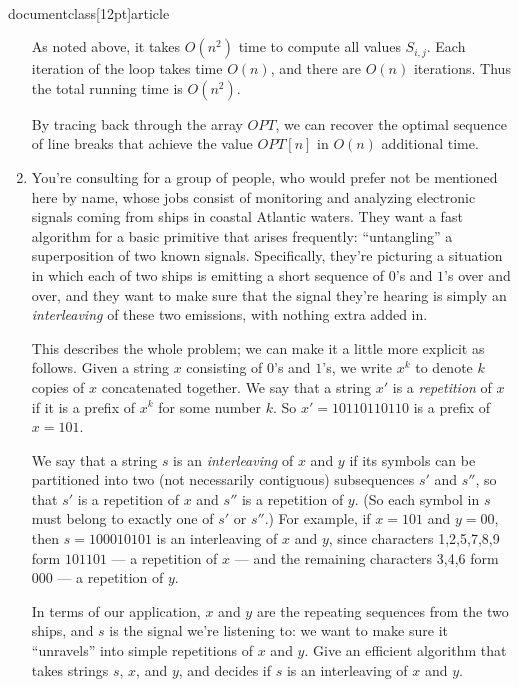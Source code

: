 \\documentclass[12pt]{article}
\begin{document}
\begin{enumerate}
{As noted above, it takes $O(n^2)$ time to compute all values $S_{i,j}$.
Each iteration of the loop takes time $O(n)$, and there are
$O(n)$ iterations.
Thus the total running time is $O(n^2)$.

By tracing back through the array $OPT$, we can recover
the optimal sequence of line breaks that achieve the
value $OPT[n]$ in $O(n)$ additional time.

}


\item

You're consulting for a group of people,
who would prefer not be mentioned here by name,
whose jobs consist of
monitoring and analyzing electronic signals coming from ships in
coastal Atlantic waters.
They want a fast algorithm for a basic primitive that arises frequently:
``untangling'' a superposition of two known signals.
Specifically, they're picturing a situation
in which each of two ships is emitting a short sequence
of $0$'s and $1$'s over and over, and they want to make sure
that the signal they're hearing is simply an {\em interleaving}
of these two emissions, with nothing extra added in.

This describes the whole problem;
we can make it a little more explicit as follows.
Given a string $x$ consisting of $0$'s and $1$'s,
we write $x^k$ to denote $k$ copies of $x$ concatenated together.
We say that a string $x'$ is a {\em repetition} of $x$
if it is a prefix of $x^k$ for some number $k$.
So $x' = 10110110110$ is a prefix of $x = 101$.

We say that a string $s$ is an {\em interleaving} of $x$ and $y$
if its symbols can be partitioned into two
(not necessarily contiguous) subsequences $s'$ and $s''$,
so that $s'$ is a repetition of $x$ and $s''$ is a repetition of $y$.
(So each symbol in $s$ must belong to exactly one of $s'$ or $s''$.)
For example, if $x = 101$ and $y = 00$, then $s = 100010101$ is
an interleaving of $x$ and $y$, since characters 1,2,5,7,8,9
form $101101$ --- a repetition of $x$ ---
and the remaining characters 3,4,6 form $000$ --- a repetition of $y$.

In terms of our application, $x$ and $y$ are the repeating sequences
from the two ships, and $s$ is the signal we're listening to:
we want to make sure it ``unravels'' into simple repetitions of $x$ and $y$.
Give an efficient algorithm that takes strings $s$, $x$, and $y$,
and decides if $s$ is an interleaving of $x$ and $y$.


\end{enumerate}
\end{document}
